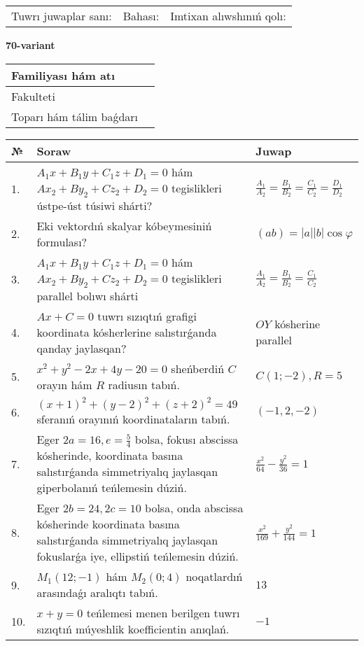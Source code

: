 \documentclass{article}
\begin{document}
\vspace{1cm}

\begin{tabular}{lll}
Tuwrı juwaplar sanı: \underline{\hspace{1.5cm}} & 
Bahası: \underline{\hspace{1.5cm}} & 
Imtixan alıwshınıń qolı: \underline{\hspace{2cm}} \\
\end{tabular}

\egroup

\newpage


\textbf{70-variant}\\

\bgroup
\def\arraystretch{1.6} %

\begin{tabular}{|m{5.7cm}|m{9.5cm}|}
\hline
Familiyası hám atı & \\
\hline
Fakulteti  & \\
\hline
Toparı hám tálim baǵdarı  & \\
\hline
\end{tabular}

\vspace{1cm}

\begin{tabular}{|m{0.7cm}|m{10cm}|m{4cm}|}
\hline
№ & Soraw & Juwap \\
\hline
1. & $A_1x+B_1y+C_1z+D_1=0$ hám $Ax_2+By_2+Cz_2+D_2=0$ tegislikleri ústpe-úst túsiwi shárti? & $\frac{A_1}{A_2}=\frac{B_1}{B_2}=\frac{C_1}{C_2}=\frac{D_1}{D_2}$ \\
\hline
2. & Eki vektordıń skalyar kóbeymesiniń formulası? & $(ab)=|a||b|\cos\varphi$ \\
\hline
3. & $A_1x+B_1y+C_1z+D_1=0$ hám $Ax_2+By_2+Cz_2+D_2=0$ tegislikleri parallel bolıwı shárti & $\frac{A_1}{A_2}=\frac{B_1}{B_2}=\frac{C_1}{C_2}$ \\
\hline
4. & $Ax+C=0$ tuwrı sızıqtıń grafigi koordinata kósherlerine salıstırǵanda qanday jaylasqan? & $OY$ kósherine parallel \\
\hline
5. & $x^{2}+y^{2}-2x+4y-20=0$ sheńberdiń $C$ orayın hám $R$ radiusın tabıń. & $C(1;-2), R=5$ \\
\hline
6. & $(x+1)^{2}+(y-2) ^{2}+(z+2) ^{2}=49$ sferanıń orayınıń koordinataların tabıń. & $(-1,2,-2)$ \\
\hline
7. & Eger $2a=16, e=\frac{5}{4}$ bolsa, fokusı abscissa kósherinde, koordinata basına salıstırǵanda simmetriyalıq jaylasqan giperbolanıń teńlemesin dúziń. & $\frac{x^{2}}{64}-\frac{y^{2}}{36}=1$ \\
\hline
8. & Eger $2b=24, 2 c=10$ bolsa, onda abscissa kósherinde koordinata basına salıstırǵanda simmetriyalıq jaylasqan fokuslarǵa iye, ellipstiń teńlemesin dúziń. & $\frac{x^{2}}{169}+\frac{y^{2}}{144}=1$ \\
\hline
9. & $M_{1} (12;-1)$ hám $M_{2} (0;4)$ noqatlardıń arasındaǵı aralıqtı tabıń. & $13$ \\
\hline
10. & $x+y=0$ teńlemesi menen berilgen tuwrı sızıqtıń múyeshlik koefficientin anıqlań. & $- 1$ \\
\hline
\end{tabular}
\end{document}

